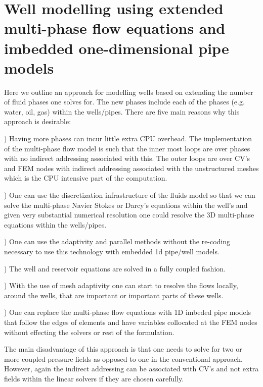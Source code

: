 \pagebreak




\section{Well modelling using extended multi-phase flow equations 
and imbedded one-dimensional pipe models} 
\label{Well modelling using extended multi-phase flow equations}
Here we outline an approach for modelling wells based on extending the number of 
fluid phases one solves for. The new phases include each of the phases (e.g. water, oil, gas) 
within the wells/pipes. There are five main reasons why this approach is desirable:
\par{}) Having more phases can incur little extra CPU overhead. 
The implementation of the multi-phase flow model is such that the inner most loops 
are over phases with no indirect addressing associated with this. The outer loops 
are over CV's and FEM nodes with indirect addressing associated with the unstructured meshes 
which is the CPU intensive part of the 
computation.  
\par{}) One can use the discretization infrastructure of the fluids model so that we can solve the 
multi-phase 
Navier Stokes or Darcy's equations within the well's and given very substantial numerical 
resolution one could resolve the 3D multi-phase equations within the wells/pipes. 
\par{}) One can use the adaptivity and parallel methods without the re-coding necessary 
to use this technology with embedded 1d pipe/well models. 
\par{}) The well and reservoir equations are solved in a fully coupled fashion. 
\par{}) With the use of mesh adaptivity one can start to resolve the flows locally, around the 
wells, that are important or important parts of these wells.   
\par{}) One can replace the multi-phase flow equations with 1D imbeded pipe models that 
follow the edges of elements and have variables collocated at the FEM nodes without 
effecting the solvers or rest of the formulation. 

The main disadvantage of this approach is that one needs to solve for two or more 
coupled pressure fields as opposed to one in the conventional approach. 
However, again the indirect addressing can be associated with CV's and not 
extra fields within the linear solvers if they are chosen carefully.   

